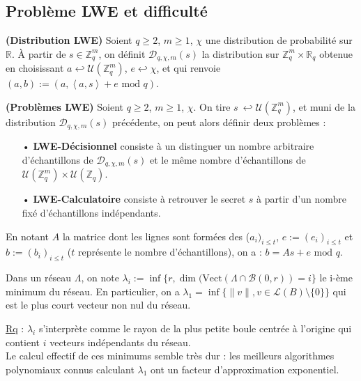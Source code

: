 \documentclass[11pt,a4paper]{article}
\begin{document}
\subsection{Problème LWE et difficulté}

\begin{defin}\textbf{(Distribution LWE)}
Soient $q\geq 2$, $m\geq 1$, $\chi$ une distribution de probabilité sur $\mathbb{R}$. À partir de $s\in \mathbb{Z}_q^m$, on définit $\mathcal{D}_{q,\chi,m}(s)$ la distribution sur $\mathbb{Z}_q^m\times\mathbb{R}_q$ obtenue en choisissant $a \hookleftarrow \mathcal{U}(\mathbb{Z}_q^m)$, $e\hookleftarrow \chi$, et qui renvoie $(a,b):=(a,\left<a,s\right> +e \text{ mod } q)$.
\end{defin}

\begin{defin}\textbf{(Problèmes LWE)}
Soient $q\geq 2$, $m\geq 1$, $\chi$. On tire $s\ \hookleftarrow \mathcal{U}( \mathbb{Z}_q^m)$, et muni de la distribution $\mathcal{D}_{q,\chi,m}(s)$ précédente, on peut alors définir deux problèmes : 
\begin{enumerate}
\item[•]\textbf{LWE-Décisionnel} consiste à un distinguer un nombre arbitraire d'échantillons de $\mathcal{D}_{q,\chi,m}(s)$ et le même nombre d'échantillons de $\mathcal{U}(\mathbb{Z}_q^m)\times\mathcal{U}(\mathbb{Z}_q)$.
\item[•]\textbf{LWE-Calculatoire} consiste à retrouver le secret $s$ à partir d'un nombre fixé d'échantillons indépendants.
\end{enumerate}
\end{defin}

En notant $A$ la matrice dont les lignes sont formées des ($a_i)_{i\leq t}$, $e:=(e_i)_{i\leq t}$ et $b:=(b_i)_{i\leq t}$ ($t$ représente le nombre d'échantillons), on a : $b=As +e \text{ mod } q$.

\begin{defin}
Dans un réseau $\Lambda$, on note $\lambda_i := \inf\{r,\dim(\text{Vect}(\Lambda\cap\mathcal{B}(0,r))=i\}$ le i-ème minimum du réseau. En particulier, on a $\lambda_1 = \inf\{\|v\| ,  v \in \mathcal{L}(B)\setminus\{0\}\}$ qui est le plus court vecteur non nul du réseau.
\end{defin}

\underline{Rq} : $\lambda_i$ s'interprète comme le rayon de la plus petite boule centrée à l'origine qui contient $i$ vecteurs indépendants du réseau. \\ Le calcul effectif de ces minimums semble très dur : les meilleurs algorithmes polynomiaux connus calculant $\lambda_1$ ont un facteur d'approximation exponentiel. \\
\end{document}
